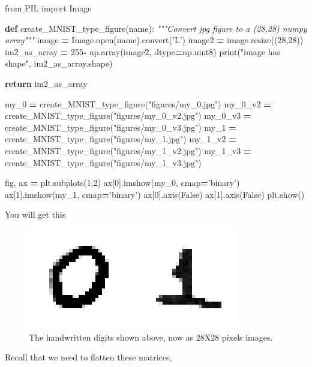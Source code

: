 \documentclass[openany,twoside]{book}
\newenvironment{Shaded}{\begin{snugshade}}{\end{snugshade}}
\newcommand{\BuiltInTok}[1]{#1}
\newcommand{\CommentTok}[1]{\textcolor[rgb]{0.56,0.35,0.01}{\textit{#1}}}
\newcommand{\ControlFlowTok}[1]{\textcolor[rgb]{0.13,0.29,0.53}{\textbf{#1}}}
\newcommand{\DecValTok}[1]{\textcolor[rgb]{0.00,0.00,0.81}{#1}}
\newcommand{\ImportTok}[1]{#1}
\newcommand{\KeywordTok}[1]{\textcolor[rgb]{0.13,0.29,0.53}{\textbf{#1}}}
\newcommand{\NormalTok}[1]{#1}
\newcommand{\OperatorTok}[1]{\textcolor[rgb]{0.81,0.36,0.00}{\textbf{#1}}}
\newcommand{\StringTok}[1]{\textcolor[rgb]{0.31,0.60,0.02}{#1}}
\newcommand{\VariableTok}[1]{\textcolor[rgb]{0.00,0.00,0.00}{#1}}
\begin{document}
\begin{Shaded}
\begin{Highlighting}[]
\ImportTok{from}\NormalTok{ PIL }\ImportTok{import}\NormalTok{ Image}

\KeywordTok{def}\NormalTok{ create_MNIST_type_figure(name):}
    \CommentTok{"""Convert jpg figure to a (28,28) numpy array"""}
\NormalTok{    image }\OperatorTok{=}\NormalTok{ Image.}\BuiltInTok{open}\NormalTok{(name).convert(}\StringTok{'L'}\NormalTok{)}
\NormalTok{    image2 }\OperatorTok{=}\NormalTok{ image.resize((}\DecValTok{28}\NormalTok{,}\DecValTok{28}\NormalTok{))}
\NormalTok{    im2_as_array }\OperatorTok{=} \DecValTok{255}\OperatorTok{-}\NormalTok{ np.array(image2,  dtype}\OperatorTok{=}\NormalTok{np.uint8)}
    \BuiltInTok{print}\NormalTok{(}\StringTok{"image has shape"}\NormalTok{, im2_as_array.shape)}

    \ControlFlowTok{return}\NormalTok{ im2_as_array}

\NormalTok{my_0 }\OperatorTok{=}\NormalTok{ create_MNIST_type_figure(}\StringTok{"figures/my_0.jpg"}\NormalTok{)}
\NormalTok{my_0_v2 }\OperatorTok{=}\NormalTok{ create_MNIST_type_figure(}\StringTok{"figures/my_0_v2.jpg"}\NormalTok{)}
\NormalTok{my_0_v3 }\OperatorTok{=}\NormalTok{ create_MNIST_type_figure(}\StringTok{"figures/my_0_v3.jpg"}\NormalTok{)}
\NormalTok{my_1 }\OperatorTok{=}\NormalTok{ create_MNIST_type_figure(}\StringTok{"figures/my_1.jpg"}\NormalTok{)}
\NormalTok{my_1_v2 }\OperatorTok{=}\NormalTok{ create_MNIST_type_figure(}\StringTok{"figures/my_1_v2.jpg"}\NormalTok{)}
\NormalTok{my_1_v3 }\OperatorTok{=}\NormalTok{ create_MNIST_type_figure(}\StringTok{"figures/my_1_v3.jpg"}\NormalTok{)}

\NormalTok{fig, ax }\OperatorTok{=}\NormalTok{ plt.subplots(}\DecValTok{1}\NormalTok{,}\DecValTok{2}\NormalTok{)}
\NormalTok{ax[}\DecValTok{0}\NormalTok{].imshow(my_0, cmap}\OperatorTok{=}\StringTok{'binary'}\NormalTok{)}
\NormalTok{ax[}\DecValTok{1}\NormalTok{].imshow(my_1, cmap}\OperatorTok{=}\StringTok{'binary'}\NormalTok{)}
\NormalTok{ax[}\DecValTok{0}\NormalTok{].axis(}\VariableTok{False}\NormalTok{)}
\NormalTok{ax[}\DecValTok{1}\NormalTok{].axis(}\VariableTok{False}\NormalTok{)}
\NormalTok{plt.show()}
\end{Highlighting}
\end{Shaded}

You will get this

\begin{figure}[htbp]
\centering
\includegraphics{figures/output_87_1.png}
\caption{The handwritten digits shown above, now as 28X28 pixels images.}
\end{figure}
Recall that we need to flatten these matrices,
\end{document}
